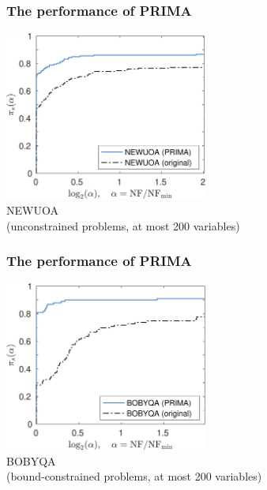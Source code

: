 \documentclass[slidestop,mathserif,xcolor=dvipsnames]{beamer}
\begin{document}
\begin{frame}
    \frametitle{The performance of PRIMA}
    \vspace{3ex}
    \begin{center}
    \includegraphics[width=0.5\textwidth]{prima_newuoa.png}
    \\[2ex]NEWUOA \\[1ex](unconstrained problems, at most 200 variables)
    \end{center}
\end{frame}

\begin{frame}
    \frametitle{The performance of PRIMA}
    \vspace{3ex}
    \begin{center}
    \includegraphics[width=0.5\textwidth]{prima_bobyqa.png}
    \\[2ex]BOBYQA \\[1ex](bound-constrained problems, at most 200 variables)
    \end{center}
\end{frame}
\end{document}
